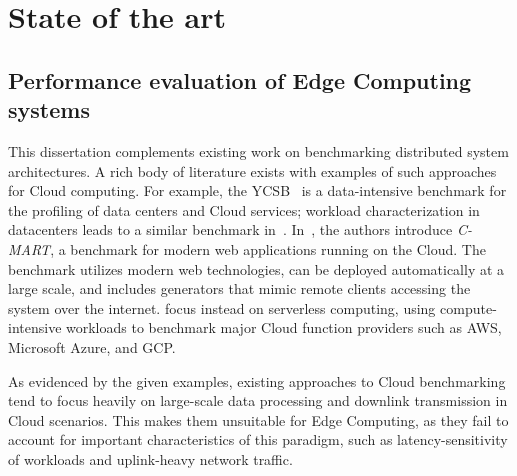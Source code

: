 \section{State of the art}

\subsection{Performance evaluation of Edge Computing systems}


This dissertation complements existing work on benchmarking distributed system architectures.
A rich body of literature exists with examples of such approaches for Cloud computing.
For example, the \gls{YCSB}~\cite{cooper2010benchmarking} is a data-intensive benchmark for the profiling of data centers and Cloud services; workload characterization in datacenters leads to a similar benchmark in~\cite{jia2013characterizing}.
In~\cite{turner2012cmart}, the authors introduce \emph{C-MART}, a benchmark for modern web applications running on the Cloud.
The benchmark utilizes modern web technologies, can be deployed automatically at a large scale, and includes generators that mimic remote clients accessing the system over the internet.\@
\cite{malawski2018benchmarking,back2018using} focus instead on serverless computing, using compute-intensive workloads to benchmark major Cloud function providers such as \gls{AWS}, Microsoft Azure, and \gls{GCP}.

As evidenced by the given examples, existing approaches to Cloud benchmarking tend to focus heavily on large-scale data processing and downlink transmission in Cloud scenarios.
This makes them unsuitable for Edge Computing, as they fail to account for important characteristics of this paradigm, such as latency-sensitivity of workloads and uplink-heavy network traffic.

